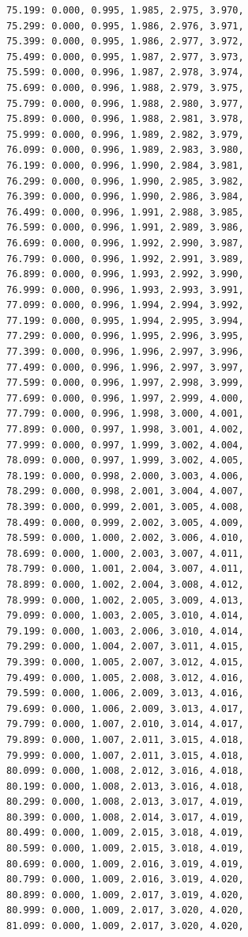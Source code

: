 \documentclass[12pt, a4paper]{article}
\begin{document}
\begin{scriptsize}
\begin{ttfamily}
\begin{lstlisting}
75.199: 0.000, 0.995, 1.985, 2.975, 3.970, 
75.299: 0.000, 0.995, 1.986, 2.976, 3.971, 
75.399: 0.000, 0.995, 1.986, 2.977, 3.972, 
75.499: 0.000, 0.995, 1.987, 2.977, 3.973, 
75.599: 0.000, 0.996, 1.987, 2.978, 3.974, 
75.699: 0.000, 0.996, 1.988, 2.979, 3.975, 
75.799: 0.000, 0.996, 1.988, 2.980, 3.977, 
75.899: 0.000, 0.996, 1.988, 2.981, 3.978, 
75.999: 0.000, 0.996, 1.989, 2.982, 3.979, 
76.099: 0.000, 0.996, 1.989, 2.983, 3.980, 
76.199: 0.000, 0.996, 1.990, 2.984, 3.981, 
76.299: 0.000, 0.996, 1.990, 2.985, 3.982, 
76.399: 0.000, 0.996, 1.990, 2.986, 3.984, 
76.499: 0.000, 0.996, 1.991, 2.988, 3.985, 
76.599: 0.000, 0.996, 1.991, 2.989, 3.986, 
76.699: 0.000, 0.996, 1.992, 2.990, 3.987, 
76.799: 0.000, 0.996, 1.992, 2.991, 3.989, 
76.899: 0.000, 0.996, 1.993, 2.992, 3.990, 
76.999: 0.000, 0.996, 1.993, 2.993, 3.991, 
77.099: 0.000, 0.996, 1.994, 2.994, 3.992, 
77.199: 0.000, 0.995, 1.994, 2.995, 3.994, 
77.299: 0.000, 0.996, 1.995, 2.996, 3.995, 
77.399: 0.000, 0.996, 1.996, 2.997, 3.996, 
77.499: 0.000, 0.996, 1.996, 2.997, 3.997, 
77.599: 0.000, 0.996, 1.997, 2.998, 3.999, 
77.699: 0.000, 0.996, 1.997, 2.999, 4.000, 
77.799: 0.000, 0.996, 1.998, 3.000, 4.001, 
77.899: 0.000, 0.997, 1.998, 3.001, 4.002, 
77.999: 0.000, 0.997, 1.999, 3.002, 4.004, 
78.099: 0.000, 0.997, 1.999, 3.002, 4.005, 
78.199: 0.000, 0.998, 2.000, 3.003, 4.006, 
78.299: 0.000, 0.998, 2.001, 3.004, 4.007, 
78.399: 0.000, 0.999, 2.001, 3.005, 4.008, 
78.499: 0.000, 0.999, 2.002, 3.005, 4.009, 
78.599: 0.000, 1.000, 2.002, 3.006, 4.010, 
78.699: 0.000, 1.000, 2.003, 3.007, 4.011, 
78.799: 0.000, 1.001, 2.004, 3.007, 4.011, 
78.899: 0.000, 1.002, 2.004, 3.008, 4.012, 
78.999: 0.000, 1.002, 2.005, 3.009, 4.013, 
79.099: 0.000, 1.003, 2.005, 3.010, 4.014, 
79.199: 0.000, 1.003, 2.006, 3.010, 4.014, 
79.299: 0.000, 1.004, 2.007, 3.011, 4.015, 
79.399: 0.000, 1.005, 2.007, 3.012, 4.015, 
79.499: 0.000, 1.005, 2.008, 3.012, 4.016, 
79.599: 0.000, 1.006, 2.009, 3.013, 4.016, 
79.699: 0.000, 1.006, 2.009, 3.013, 4.017, 
79.799: 0.000, 1.007, 2.010, 3.014, 4.017, 
79.899: 0.000, 1.007, 2.011, 3.015, 4.018, 
79.999: 0.000, 1.007, 2.011, 3.015, 4.018, 
80.099: 0.000, 1.008, 2.012, 3.016, 4.018, 
80.199: 0.000, 1.008, 2.013, 3.016, 4.018, 
80.299: 0.000, 1.008, 2.013, 3.017, 4.019, 
80.399: 0.000, 1.008, 2.014, 3.017, 4.019, 
80.499: 0.000, 1.009, 2.015, 3.018, 4.019, 
80.599: 0.000, 1.009, 2.015, 3.018, 4.019, 
80.699: 0.000, 1.009, 2.016, 3.019, 4.019, 
80.799: 0.000, 1.009, 2.016, 3.019, 4.020, 
80.899: 0.000, 1.009, 2.017, 3.019, 4.020, 
80.999: 0.000, 1.009, 2.017, 3.020, 4.020, 
81.099: 0.000, 1.009, 2.017, 3.020, 4.020, 

\end{lstlisting}
\end{ttfamily}
\end{scriptsize}
\end{document}
